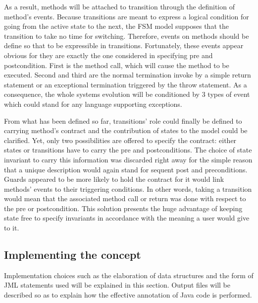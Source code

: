 As a result, methods will be attached to transition through the definition of method's events. Because transitions are meant to express a logical condition for going from the active state to the next, the FSM model supposes that the transition to take no time for switching. Therefore, events on methods should be define so that to be expressible in transitions. Fortunately, these events appear obvious for they are exactly the one considered in specifying pre and postcondition. First is the method call, which will cause the method to be executed. Second and third are the normal termination invoke by a simple return statement or an exceptional termination triggered by the throw statement. As a consequence, the whole systems evolution will be conditioned by 3 types of event which could stand for any language supporting exceptions.

From what has been defined so far, transitions' role could finally be defined to carrying method's contract and the contribution of states to the model could be clarified. Yet, only two possibilities are offered to specify the contract: either states or transitions have to carry the pre and postconditions. The choice of state invariant to carry this information was discarded right away for the simple reason that a unique description would again stand for sequent post and preconditions. Guards appeared to be more likely to hold the contract for it would link methods' events to their triggering conditions. In other words, taking a transition would mean that the associated method call or return was done with respect to the pre or postcondition. This solution presents the huge advantage of keeping state free to specify invariants in accordance with the meaning a user would give to it. 

\subsection{Implementing the concept}
Implementation choices such as the elaboration of data structures and the form of JML statements used will be explained in this section. Output files will be described so as to explain how the effective annotation of Java code is performed. 

